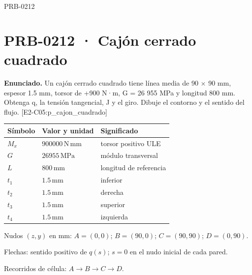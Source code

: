 \begin{studiumworked}{PRB-0212}

\section{PRB-0212 · Cajón cerrado cuadrado}

\textbf{Enunciado.} Un cajón cerrado cuadrado tiene línea media de 90 \ensuremath{\times} 90 mm, espesor 1.5 mm, torsor de +900 N·m, G = 26 955 MPa y longitud 800 mm. Obtenga q, la tensión tangencial, J y el giro. Dibuje el contorno y el sentido del flujo. [E2-C05:p\_cajon\_cuadrado]

\par\medskip\noindent\begin{tabular}{@{}p{.18\linewidth}p{.26\linewidth}p{.48\linewidth}@{}}
\toprule Símbolo & Valor y unidad & Significado\\\midrule
$M_{x}$ & $900000\,\mathrm{N\,mm}$ & torsor positivo ULE\\
$G$ & $26955\,\mathrm{MPa}$ & módulo transversal\\
$L$ & $800\,\mathrm{mm}$ & longitud de referencia\\
$t_{1}$ & $1.5\,\mathrm{mm}$ & inferior\\
$t_{2}$ & $1.5\,\mathrm{mm}$ & derecha\\
$t_{3}$ & $1.5\,\mathrm{mm}$ & superior\\
$t_{4}$ & $1.5\,\mathrm{mm}$ & izquierda\\
\bottomrule\end{tabular}\par\medskip

\par\medskip\noindent\begin{minipage}{\linewidth}\centering
{}
\par\small Nudos $(z,y)$ en mm: $A=(0,0)$; $B=(90,0)$; $C=(90,90)$; $D=(0,90)$.
\par\small Flechas: sentido positivo de $q(s)$; $s=0$ en el nudo inicial de cada pared.
\par\small Recorridos de célula: $A\to B\to C\to D$.
\par\normalsize\end{minipage}\par\medskip


\end{studiumworked}
